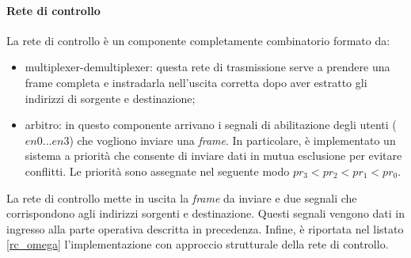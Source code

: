 \paragraph{Rete di controllo}
La rete di controllo è un componente completamente combinatorio formato da:
\begin{itemize}
    \item multiplexer-demultiplexer: questa rete di trasmissione serve a prendere una frame completa e instradarla nell'uscita corretta dopo aver estratto gli indirizzi di sorgente e destinazione;
    \item arbitro: in questo componente arrivano i segnali di abilitazione degli utenti ($en0...en3$) che vogliono inviare una \textit{frame}. In particolare, è implementato un sistema a priorità che consente di inviare dati in mutua esclusione per evitare conflitti. Le priorità sono assegnate nel seguente modo $pr_3<pr_2<pr_1<pr_0$.
\end{itemize}

La rete di controllo mette in uscita la \textit{frame} da inviare e due segnali che corrispondono agli indirizzi sorgenti e destinazione. Questi segnali vengono dati in ingresso alla parte operativa descritta in precedenza. Infine, è riportata nel listato \ref{rc_omega} l'implementazione con approccio strutturale della rete di controllo.

